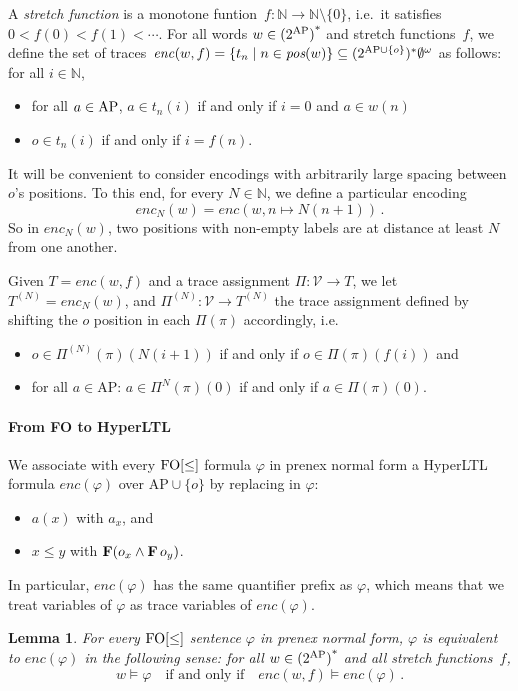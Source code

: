 \documentclass[dvipsnames,10pt,a4paper]{amsart}
\newtheorem{lem}[thm]{Lemma}
\theoremstyle{definition}
\theoremstyle{remark}
\newcommand{\set}[1]{\{#1\}}
\newcommand{\nats}{\mathbb{N}}
\newcommand\Nat{\nats}
\newcommand{\F}{\mathop{\mathbf{F}\vphantom{a}}\nolimits}
\newcommand{\hyltl}{{HyperLTL}\xspace}
\newcommand\FO{\textup{FO}}
\newcommand{\var}{\mathcal{V}}
\newcommand{\ap}[0]{\mathrm{AP}}
\newcommand\AP{\textup{AP}}
\newcommand\FOw{\FO[\le]}
\newcommand\pos{\textit{pos}}
\newcommand\enc[2]{\mathit{enc}(#1,#2)}
\newcommand\encn[2]{\mathit{enc}_{#2}(#1)}
\newcommand\tn[2]{#1^{(#2)}}
\newcommand\nun[2]{#1^{(#2)}}
\newcommand\encPhi[1]{\mathit{enc}(#1)}
\begin{document}
A \emph{stretch function} is a monotone funtion~$f: \Nat \to  \Nat\setminus\set{0}$, i.e.\ it satisfies $0 < f(0) < f(1) < \cdots$.
For all words $w \in {(2^{\AP})}^\ast$ and stretch functions~$f$, we define the set of traces~$\enc w f = \{t_n \mid n \in \pos(w)\} \subseteq (2^{\AP \cup \{o\}})^\ast\emptyset^\omega$
as follows: for all $i \in \Nat$,
\begin{itemize}
\item for all $a \in \AP$,
  $a \in t_n(i)$ if and only if $i = 0$ and $a \in w(n)$
\item $o \in t_n(i)$ if and only if $i = f(n)$.
\end{itemize}

It will be convenient to consider encodings with arbitrarily large spacing
between $o$'s positions.
To this end, for every $N \in \Nat$, we define a particular encoding
\[
  \encn w N = \enc w {n \mapsto N(n+1)} \, .
\]
So in $\encn w N$, two positions with non-empty labels are at distance at
least $N$ from one another.

Given $T = \enc w f$ and a trace assignment
$\Pi \colon \var \rightarrow T$,
we let $\tn T N = \encn w N$, and
$\nun \Pi N \colon \var \rightarrow \tn T N$ the trace assignment defined
by shifting the $o$ position in each $\Pi(\pi)$ accordingly, i.e.
\begin{itemize}
	\item $o \in \Pi^{(N)}(\pi) (N(i+1))$ if and only if $o \in \Pi(\pi)(f(i))$ and
	\item for all $a \in \ap$: $a \in \Pi^{N}(\pi)(0)$ if and only if $a \in \Pi(\pi)(0)$.
\end{itemize}


\paragraph{From FO to \hyltl}
We associate with every $\FOw$ formula $\varphi $ in prenex normal form
a \hyltl formula $\encPhi \varphi$ over $\ap \cup \{o\}$ by replacing
in $\varphi$:
\begin{itemize}
\item $a(x)$ with $a_x$, and
\item $x \le y$ with $\F(o_x \land \F o_y)$. 
\end{itemize}
In particular, $\encPhi \varphi$ has the same quantifier prefix as $\varphi$, which means that we treat variables of $\varphi$ as trace variables of $\encPhi{\varphi}$.

\begin{lem}\label{lem:FO-to-hyltl}
  For every $ \FOw$ sentence $\varphi $ in prenex normal form,
  $\varphi$ is equivalent to $\encPhi \varphi$ in the following sense:
  for all $w \in {(2^{\AP})}^\ast$ and all stretch functions~$f$,
  \[
    w \models \varphi \quad\text{if and only if}\quad
    \enc w f \models \encPhi \varphi \, .
  \]
\end{lem}
\end{document}
